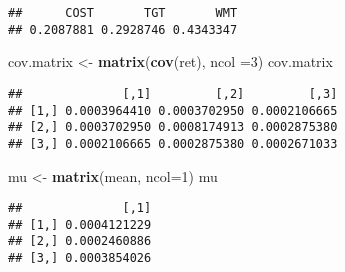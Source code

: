 \documentclass[]{article}
\newenvironment{Shaded}{\begin{snugshade}}{\end{snugshade}}
\newcommand{\DataTypeTok}[1]{\textcolor[rgb]{0.13,0.29,0.53}{#1}}
\newcommand{\DecValTok}[1]{\textcolor[rgb]{0.00,0.00,0.81}{#1}}
\newcommand{\FloatTok}[1]{\textcolor[rgb]{0.00,0.00,0.81}{#1}}
\newcommand{\KeywordTok}[1]{\textcolor[rgb]{0.13,0.29,0.53}{\textbf{#1}}}
\newcommand{\NormalTok}[1]{#1}
\newcommand{\OperatorTok}[1]{\textcolor[rgb]{0.81,0.36,0.00}{\textbf{#1}}}
\newcommand{\StringTok}[1]{\textcolor[rgb]{0.31,0.60,0.02}{#1}}
\begin{document}
\begin{verbatim}
##      COST       TGT       WMT 
## 0.2087881 0.2928746 0.4343347
\end{verbatim}

\begin{Shaded}
\begin{Highlighting}[]
\NormalTok{cov.matrix <-}\StringTok{ }\KeywordTok{matrix}\NormalTok{(}\KeywordTok{cov}\NormalTok{(ret), }\DataTypeTok{ncol =}\DecValTok{3}\NormalTok{)}
\NormalTok{cov.matrix}
\end{Highlighting}
\end{Shaded}

\begin{verbatim}
##              [,1]         [,2]         [,3]
## [1,] 0.0003964410 0.0003702950 0.0002106665
## [2,] 0.0003702950 0.0008174913 0.0002875380
## [3,] 0.0002106665 0.0002875380 0.0002671033
\end{verbatim}

\begin{Shaded}
\begin{Highlighting}[]
\NormalTok{mu <-}\StringTok{ }\KeywordTok{matrix}\NormalTok{(mean, }\DataTypeTok{ncol=}\DecValTok{1}\NormalTok{)}
\NormalTok{mu}
\end{Highlighting}
\end{Shaded}

\begin{verbatim}
##              [,1]
## [1,] 0.0004121229
## [2,] 0.0002460886
## [3,] 0.0003854026
\end{verbatim}

\begin{Shaded}
\end{Shaded}
\end{document}
